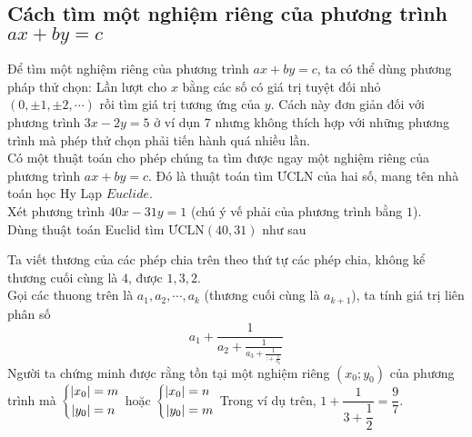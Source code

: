\subsection{Cách tìm một nghiệm riêng của phương trình $ax + by = c$}
Để tìm một nghiệm riêng của phương trình $ax+by=c$, ta có thể dùng phương pháp thử chọn: Lần lượt cho $x$ bằng các số có giá trị tuyệt đối nhỏ $(0, \pm 1, \pm 2, \cdots )$ rồi tìm giá trị tương ứng của $y$.
Cách này đơn giản đối với phương trình $3x - 2y = 5$ ở ví dụn $7$ nhưng không thích hợp với những  phương trình mà phép thử chọn phải tiến hành quá nhiều lần.\\
Có một thuật toán cho phép chúng ta tìm được ngay một nghiệm riêng của phương trình $ax + by = c$. Đó là thuật toán tìm ƯCLN của hai số, mang tên nhà toán học Hy Lạp $Euclide$.\\
Xét phương trình $40x - 31  y = 1$ (chú ý vế phải của phương trình bằng $1$).\\
Dùng thuật toán Euclid tìm ƯCLN$(40,31)$ như sau
\begin{center}
\end{center}
Ta viết thương của các phép chia trên theo thứ tự các phép chia, không kể thương cuối cùng là $4$, được $1,3,2$.\\
Gọi các thuong trên là $a_1, a_2, \cdots , a_k$ (thương cuối cùng là $a_{k+1}$), ta tính giá trị liên phân số
$$\displaystyle a_1 + \displaystyle \frac{1}{a_2 + \displaystyle \frac{1}{a_3 + \displaystyle \frac{1}{ \vdots + \displaystyle \frac{1}{a_k}}}}$$
Người ta chứng minh được rằng tồn tại một nghiệm riêng $(x_0;y_0)$ của phương trình mà $\left\{\begin{aligned}|x_0| &= m \\ |y_0| &= n\end{aligned}\right.$ hoặc $\left\{\begin{aligned}|x_0| &= n \\ |y_0| &= m\end{aligned}\right.$
Trong ví dụ trên, $1+ \dfrac{1}{3 + \dfrac{1}{2}}= \dfrac{9}{7}.$\\

